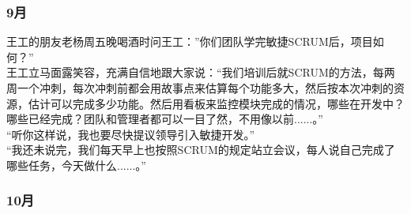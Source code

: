 \documentclass[]{article}
\begin{document}
\hypertarget{ux6708-2}{%
\subsubsection{9月}\label{ux6708-2}}

王工的朋友老杨周五晚喝酒时问王工：''你们团队学完敏捷SCRUM后，项目如何？''\\
王工立马面露笑容，充满自信地跟大家说：``我们培训后就SCRUM的方法，每两周一个冲刺，每次冲刺前都会用故事点来估算每个功能多大，然后按本次冲刺的资源，估计可以完成多少功能。然后用看板来监控模块完成的情况，哪些在开发中？哪些已经完成？团队和管理者都可以一目了然，不用像以前......。''\\
``听你这样说，我也要尽快提议领导引入敏捷开发。''\\
``我还未说完，我们每天早上也按照SCRUM的规定站立会议，每人说自己完成了哪些任务，今天做什么......。''

\hypertarget{ux6708-3}{%
\subsubsection{10月}\label{ux6708-3}}
\end{document}
